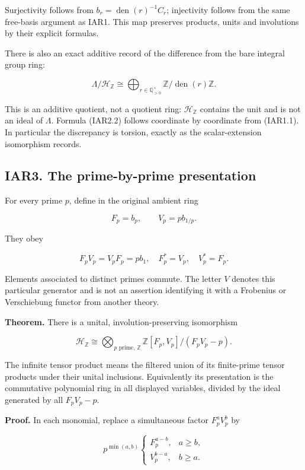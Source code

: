 \documentclass[
]{article}
\begin{document}
Surjectivity follows from \(b_r=\operatorname{den}(r)^{-1}C_r\);
injectivity follows from the same free-basis argument as IAR1. This map
preserves products, units and involutions by their explicit formulas.

There is also an exact additive record of the difference from the bare
integral group ring:

\[
\Lambda/\mathcal H_{\mathbb Z}
\cong\bigoplus_{r\in\mathbb Q_{>0}^{\times}}
\mathbb Z/\operatorname{den}(r)\mathbb Z.
\tag{IAR2.2}
\]

This is an additive quotient, not a quotient ring:
\(\mathcal H_{\mathbb Z}\) contains the unit and is not an ideal of
\(\Lambda\). Formula (IAR2.2) follows coordinate by coordinate from
(IAR1.1). In particular the discrepancy is torsion, exactly as the
scalar-extension isomorphism records.

\subsection{IAR3. The prime-by-prime
presentation}\label{iar3.-the-prime-by-prime-presentation}

For every prime \(p\), define in the original ambient ring

\[
F_p=b_p,\qquad V_p=p b_{1/p}.
\tag{IAR3.1}
\]

They obey

\[
F_pV_p=V_pF_p=p b_1,
\quad F_p^*=V_p,\quad V_p^*=F_p.
\tag{IAR3.2}
\]

Elements associated to distinct primes commute. The letter \(V\) denotes
this particular generator and is not an assertion identifying it with a
Frobenius or Verschiebung functor from another theory.

\textbf{Theorem.} There is a unital, involution-preserving isomorphism

\[
\boxed{
\mathcal H_{\mathbb Z}\cong
\bigotimes_{p\text{ prime},\,\mathbb Z}
\mathbb Z[F_p,V_p]/(F_pV_p-p).}
\tag{IAR3.3}
\]

The infinite tensor product means the filtered union of its finite-prime
tensor products under their unital inclusions. Equivalently its
presentation is the commutative polynomial ring in all displayed
variables, divided by the ideal generated by all \(F_pV_p-p\).

\textbf{Proof.} In each monomial, replace a simultaneous factor
\(F_p^aV_p^b\) by

\[
p^{\min(a,b)}
\begin{cases}
F_p^{a-b},&a\ge b,\\
V_p^{b-a},&b\ge a.
\end{cases}
\tag{IAR3.4}
\]
\end{document}
